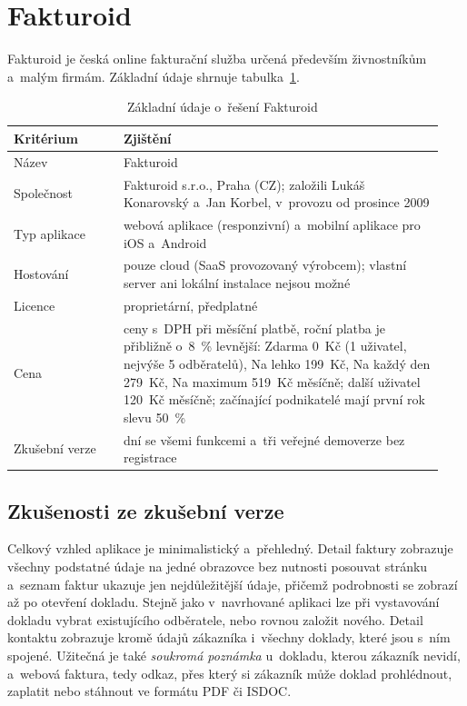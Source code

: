 \section{Fakturoid}\label{sec:reserse-fakturoid}

Fakturoid je česká online fakturační služba určená především živnostníkům a~malým firmám. Základní údaje shrnuje tabulka~\ref{tab:reserse-fakturoid}.

\begin{table}[H]
\centering
\small
\begin{tabular}{>{\raggedright\arraybackslash}p{0.24\linewidth}>{\raggedright\arraybackslash}p{0.70\linewidth}}
\hline
\textbf{Kritérium} & \textbf{Zjištění} \\
\hline
Název & Fakturoid \\
Společnost & Fakturoid s.r.o., Praha (CZ); založili Lukáš Konarovský a~Jan Korbel, v~provozu od prosince 2009 \cite{fakturoid-onas} \\
Typ aplikace & webová aplikace (responzivní) a~mobilní aplikace pro iOS a~Android \cite{fakturoid-tarify2025,fakturoid-srovnani} \\
Hostování & pouze cloud (SaaS provozovaný výrobcem); vlastní server ani lokální instalace nejsou možné \\
Licence & proprietární, předplatné \\
Cena & ceny s~DPH při měsíční platbě, roční platba je přibližně o~8~\% levnější: Zdarma 0~Kč (1 uživatel, nejvýše 5 odběratelů), Na lehko 199~Kč, Na každý den 279~Kč, Na maximum 519~Kč měsíčně; další uživatel 120~Kč měsíčně; začínající podnikatelé mají první rok slevu 50~\% \cite{fakturoid-tarify2025,fakturoid-srovnani,fakturoid-cenik} \\
Zkušební verze & 30 dní se všemi funkcemi a~tři veřejné demoverze bez registrace \cite{fakturoid-srovnani} \\
\hline
\end{tabular}
\caption{Základní údaje o~řešení Fakturoid}\label{tab:reserse-fakturoid}
\end{table}

\subsection{Zkušenosti ze zkušební verze}

Celkový vzhled aplikace je minimalistický a~přehledný. Detail faktury zobrazuje všechny podstatné údaje na jedné obrazovce bez nutnosti posouvat stránku a~seznam faktur ukazuje jen nejdůležitější údaje, přičemž podrobnosti se zobrazí až po otevření dokladu. Stejně jako v~navrhované aplikaci lze při vystavování dokladu vybrat existujícího odběratele, nebo rovnou založit nového. Detail kontaktu zobrazuje kromě údajů zákazníka i~všechny doklady, které jsou s~ním spojené. Užitečná je také \emph{soukromá poznámka} u~dokladu, kterou zákazník nevidí, a~webová faktura, tedy odkaz, přes který si zákazník může doklad prohlédnout, zaplatit nebo stáhnout ve formátu PDF či ISDOC.

